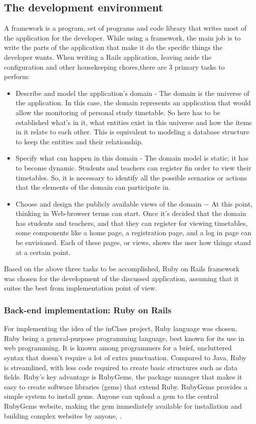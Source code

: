 \subsection{The development environment}
A framework is a program, set of programs and code library that writes most of the application for the developer. While using a framework, the main job is to write the parts of the application that make it do the specific things the developer wants. When writing a Rails application, leaving aside the configuration and other housekeeping chores,there are 3 primary tasks to perform:
\begin{itemize}
\item Describe and model the application's domain - The domain is the universe of the application. In this case, the domain represents an application that would allow the monitoring of personal study timetable. So here has to be established what's in it, what entities exist in this universe and how the items in it relate to each other. This is equivalent to modeling a database structure to keep the entities and their relationship.
\item Specify what can happen in this domain - The domain model is static; it has to become dynamic. Students  and teachers can register fin order to view their timetables. So, it is necessary to identify all the possible scenarios or actions that the elements of the domain can participate in.

\item Choose and design the publicly available views of the domain − At this point, thinking in Web-browser terms can start. Once it's decided that the domain has students and teachers, and that they can register for viewing timetables, some components like a home page, a registration page, and a log in page can be envisioned. Each of these pages, or views, shows the user how things stand at a certain point.
\end{itemize}

Based on the above three tasks to be accomplished, Ruby on Rails framework was chosen for the development of the discussed  application, assuming that it suites the best from implementation point of view. 

\subsubsection{Back-end implementation: Ruby on Rails}
For implementing the idea of the inClass project, Ruby language was chosen, Ruby being a general-purpose programming language, best known for its use in web programming. It is known among programmers for a brief, uncluttered syntax that doesn't require a lot of extra punctuation. Compared to Java, Ruby is streamlined, with less code required to create basic structures such as data fields. Ruby's key advantage is RubyGems, the package manager that makes it easy to create software libraries (gems) that extend Ruby. RubyGems provides a simple system to install gems. Anyone can upload a gem to the central RubyGems website, making the gem immediately available for installation and building complex websites by anyone, \cite{RoR}.

